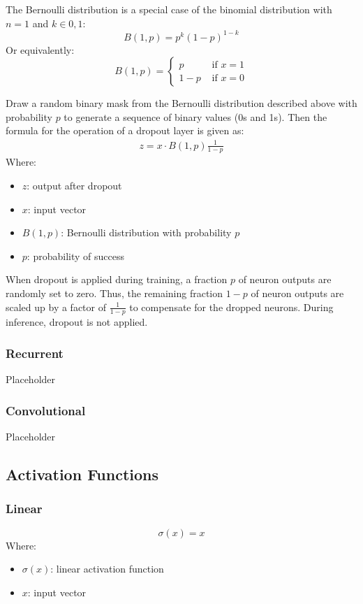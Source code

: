 \documentclass[a4paper]{article}
\begin{document}
The Bernoulli distribution is a special case of the binomial distribution with $n=1$ and $k \in {0,1}$:
\begin{equation*}
    B(1,p) = p^k (1-p)^{1-k}
\end{equation*}
Or equivalently:
\begin{equation*}
    B(1,p) = \begin{cases}
        p   & \text{ if } x=1\\
        1-p & \text{ if } x=0
    \end{cases}
\end{equation*}

Draw a random binary mask from the Bernoulli distribution described above with probability $p$ to generate a sequence of binary values (0s and 1s). Then the formula for the operation of a dropout layer is given as:
\begin{align*}
    z = x \cdot B(1,p) \frac{1}{1-p}
\end{align*}
Where:
\begin{itemize}
    \item $z$: output after dropout
    \item $x$: input vector
    \item $B(1,p)$: Bernoulli distribution with probability $p$
    \item $p$: probability of success
\end{itemize}

When dropout is applied during training, a fraction $p$ of neuron outputs are randomly set to zero. Thus, the remaining fraction $1-p$ of neuron outputs are scaled up by a factor of $\frac{1}{1-p}$ to compensate for the dropped neurons. During inference, dropout is not applied.

\subsubsection*{Recurrent}
Placeholder
\subsubsection*{Convolutional}
Placeholder

\subsection*{Activation Functions}
\subsubsection*{Linear}
\begin{equation*}
    \sigma(x) = x
\end{equation*}
Where:
\begin{itemize}
    \item $\sigma(x)$: linear activation function
    \item $x$: input vector
\end{itemize}
\end{document}
